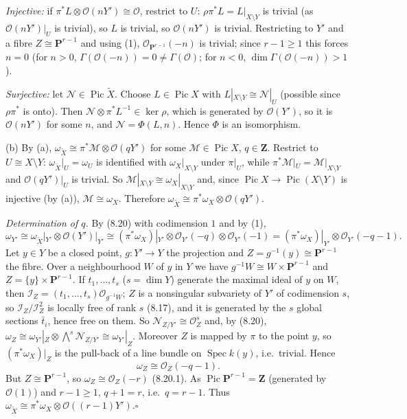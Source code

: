 \documentclass[11pt]{article}
\begin{document}
\emph{Injective:} if $\pi^*L\otimes\mathcal O(nY')\cong\mathcal O$, restrict to $U$: $\rho\pi^*L=L|_{X\setminus Y}$ is trivial (as $\mathcal O(nY')|_U$ is trivial), so $L$ is trivial, so $\mathcal O(nY')$ is trivial. Restricting to $Y'$ and a fibre $Z\cong\mathbf P^{r-1}$ and using (1), $\mathcal O_{\mathbf P^{r-1}}(-n)$ is trivial; since $r-1\ge1$ this forces $n=0$ (for $n>0$, $\Gamma(\mathcal O(-n))=0\neq\Gamma(\mathcal O)$; for $n<0$, $\dim\Gamma(\mathcal O(-n))>1$).

\emph{Surjective:} let $\mathcal N\in\operatorname{Pic}\widetilde X$. Choose $L\in\operatorname{Pic}X$ with $L|_{X\setminus Y}\cong\mathcal N|_U$ (possible since $\rho\pi^*$ is onto). Then $\mathcal N\otimes\pi^*L^{-1}\in\ker\rho$, which is generated by $\mathcal O(Y')$, so it is $\mathcal O(nY')$ for some $n$, and $\mathcal N=\Phi(L,n)$. Hence $\Phi$ is an isomorphism.

(b) By (a), $\omega_{\widetilde X}\cong\pi^*\mathcal M\otimes\mathcal O(qY')$ for some $\mathcal M\in\operatorname{Pic}X$, $q\in\mathbf Z$. Restrict to $U\cong X\setminus Y$: $\omega_{\widetilde X}|_U=\omega_U$ is identified with $\omega_X|_{X\setminus Y}$ under $\pi|_U$, while $\pi^*\mathcal M|_U=\mathcal M|_{X\setminus Y}$ and $\mathcal O(qY')|_U$ is trivial. So $\mathcal M|_{X\setminus Y}\cong\omega_X|_{X\setminus Y}$ and, since $\operatorname{Pic}X\to\operatorname{Pic}(X\setminus Y)$ is injective (by (a)), $\mathcal M\cong\omega_X$. Therefore $\omega_{\widetilde X}\cong\pi^*\omega_X\otimes\mathcal O(qY')$.

\emph{Determination of $q$.} By (8.20) with codimension $1$ and by (1),
\[\omega_{Y'}\cong\omega_{\widetilde X}|_{Y'}\otimes\mathcal O(Y')|_{Y'}\cong(\pi^*\omega_X)|_{Y'}\otimes\mathcal O_{Y'}(-q)\otimes\mathcal O_{Y'}(-1)=(\pi^*\omega_X)|_{Y'}\otimes\mathcal O_{Y'}(-q-1).\]
Let $y\in Y$ be a closed point, $g:Y'\to Y$ the projection and $Z=g^{-1}(y)\cong\mathbf P^{r-1}$ the fibre. Over a neighbourhood $W$ of $y$ in $Y$ we have $g^{-1}W\cong W\times\mathbf P^{r-1}$ and $Z=\{y\}\times\mathbf P^{r-1}$. If $t_1,\dots,t_s$ ($s=\dim Y$) generate the maximal ideal of $y$ on $W$, then $\mathcal I_Z=(t_1,\dots,t_s)\mathcal O_{g^{-1}W}$; $Z$ is a nonsingular subvariety of $Y'$ of codimension $s$, so $\mathcal I_Z/\mathcal I_Z^2$ is locally free of rank $s$ (8.17), and it is generated by the $s$ global sections $\bar t_i$, hence free on them. So $\mathcal N_{Z/Y'}\cong\mathcal O_Z^s$ and, by (8.20), $\omega_Z\cong\omega_{Y'}|_Z\otimes\bigwedge^s\mathcal N_{Z/Y'}\cong\omega_{Y'}|_Z$. Moreover $Z$ is mapped by $\pi$ to the point $y$, so $(\pi^*\omega_X)|_Z$ is the pull-back of a line bundle on $\operatorname{Spec}k(y)$, i.e.\ trivial. Hence
\[\omega_Z\cong\mathcal O_Z(-q-1).\]
But $Z\cong\mathbf P^{r-1}$, so $\omega_Z\cong\mathcal O_Z(-r)$ (8.20.1). As $\operatorname{Pic}\mathbf P^{r-1}=\mathbf Z$ (generated by $\mathcal O(1)$) and $r-1\ge1$, $q+1=r$, i.e.\ $q=r-1$. Thus $\omega_{\widetilde X}\cong\pi^*\omega_X\otimes\mathcal O((r-1)Y')$.\hfill$\square$
\end{document}
